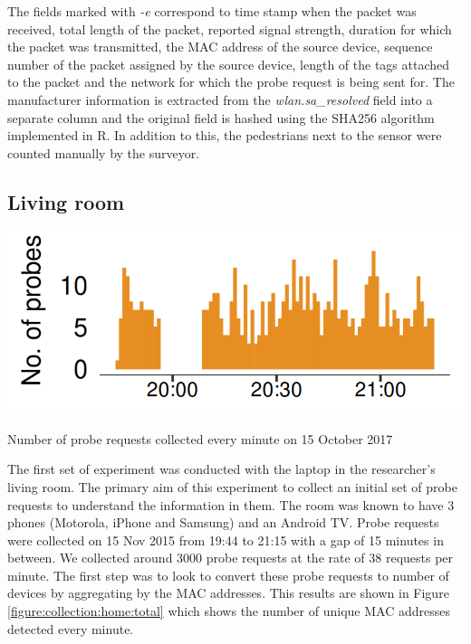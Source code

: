 The fields marked with \textit{-e} correspond to time stamp when the packet was received, total length of the packet, reported signal strength, duration for which the packet was transmitted, the MAC address of the source device, sequence number of the packet assigned by the source device, length of the tags attached to the packet and the network for which the probe request is being sent for.
The manufacturer information is extracted from the \textit{wlan.sa\_resolved} field into a separate column and the original field is hashed using the SHA256 algorithm implemented in R.
In addition to this, the pedestrians next to the sensor were counted manually by the surveyor.

\subsection{Living room}

\begin{marginfigure}
  \forcerectofloat
  \includegraphics{images/home-total-count.png}
  \caption{Number of probe requests collected every minute on 15 October 2017}
  \label{figure:collection:home:total}
\end{marginfigure}

The first set of experiment was conducted with the laptop in the researcher's living room.
The primary aim of this experiment to collect an initial set of probe requests to understand the information in them.
The room was known to have 3 phones (Motorola, iPhone and Samsung) and an Android TV.
Probe requests were collected on 15 Nov 2015 from 19:44 to 21:15 with a gap of 15 minutes in between.
We collected around 3000 probe requests at the rate of 38 requests per minute.
The first step was to look to convert these probe requests to number of devices by aggregating by the MAC addresses.
This results are shown in Figure \ref{figure:collection:home:total} which shows the number of unique MAC addresses detected every minute.


